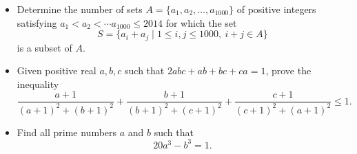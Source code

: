 \documentclass[12pt]{article}
\begin{document}
\begin{itemize}
\item %
Determine the number of sets $A = \{a_1,a_2,\ldots, a_{1000}\}$ of positive integers satisfying $a_1 < a_2 < \cdots a_{1000} \le 2014$ for which the set
	\[ S = \{a_i+a_j \mid 1\le i,j\le 1000,\ i+j\in A\} \]
is a subset of $A$.


\item %
Given positive real $a,b,c$ such that $2abc+ab+bc+ca = 1$, prove the inequality
\[ \frac{a+1}{(a+1)^2+(b+1)^2} +\frac{b+1}{(b+1)^2+(c+1)^2} +\frac{c+1}{(c+1)^2+(a+1)^2} \leq 1. \]


\item %
Find all prime numbers $a$ and $b$ such that \[ 20a^3 -b^3 = 1. \]


\end{itemize}
\end{document}
